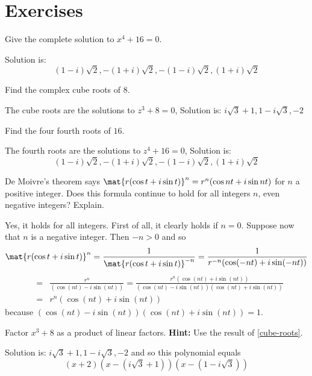 \section*{Exercises}


\begin{ex} Give the complete solution to $x^{4}+16=0$.
\begin{sol}
 Solution is:
\[
(1-i) \sqrt{2},-(1+i) \sqrt{2},-(1-i)
\sqrt{2},(1+i) \sqrt{2}
\]
\end{sol}
\end{ex}

\begin{ex} \label{cube-roots} Find the complex cube roots of $8$.
\begin{sol}
The cube roots are the solutions to $%
z^{3}+8=0$, Solution is: $i\sqrt{3} +1,1-i\sqrt{3},-2$
\end{sol}
\end{ex}

\begin{ex} \label{cube-roots2} Find the four fourth roots of $16$.
\begin{sol}
The fourth roots are
the solutions to $z^{4}+16=0$, Solution is:
\[
(1-i) \sqrt{2},-(1+i) \sqrt{2},-(1-i)
\sqrt{2},(1+i)\sqrt{2}
\]
\end{sol}
\end{ex}

\begin{ex} \label{exer-complex1}De Moivre's theorem says $\mat{r(\cos
t+i\sin t)} ^{n}=r^{n}(\cos nt+i\sin nt) $ for $n$
a positive integer. Does this formula continue to hold for all integers $n$,
even negative integers? Explain.
\begin{sol}
Yes, it holds for all integers. First of
all, it clearly holds if $n=0$. Suppose now that $n$ is a negative integer.
Then $-n>0$ and so
\[
\mat{r(\cos t+i\sin t)} ^{n}=\frac{1}{\mat{r(
\cos t+i\sin t)} ^{-n}}=\frac{1}{r^{-n}(\cos (
-nt) +i\sin (-nt)) }
\]
\begin{eqnarray*}
&=&\frac{r^{n}}{(\cos (nt) -i\sin (nt))
}=\frac{r^{n}(\cos (nt) +i\sin (nt)) }{
(\cos (nt) -i\sin (nt)) (\cos
(nt) +i\sin (nt)) } \\
&=&r^{n}(\cos (nt) +i\sin (nt))
\end{eqnarray*}
because $(\cos (nt) -i\sin (nt)) (
\cos (nt) +i\sin (nt)) =1$.
\end{sol}
\end{ex}

\begin{ex} Factor $x^{3}+8$ as a product of linear factors. \textbf{Hint:} Use the result of {\eqref{cube-roots}}.
\begin{sol}
Solution
is: $i\sqrt{3}+1,1-i\sqrt{3},-2$ and so this polynomial equals
\[
(x+2) (x-(i\sqrt{3}+1)) (x-(
1-i\sqrt{3}))
\]
\end{sol}
\end{ex}

